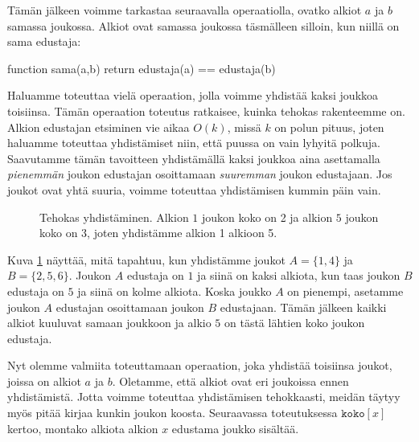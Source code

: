 Tämän jälkeen voimme tarkastaa seuraavalla operaatiolla,
ovatko alkiot $a$ ja $b$ samassa joukossa.
Alkiot ovat samassa joukossa täsmälleen silloin, kun niillä
on sama edustaja:

\begin{code}
function sama(a,b)
    return edustaja(a) == edustaja(b)
\end{code}

Haluamme toteuttaa vielä operaation, jolla voimme
yhdistää kaksi joukkoa toisiinsa.
Tämän operaation toteutus ratkaisee, kuinka tehokas rakenteemme on.
Alkion edustajan etsiminen vie aikaa $O(k)$,
missä $k$ on polun pituus,
joten haluamme toteuttaa yhdistämiset niin,
että puussa on vain lyhyitä polkuja.
Saavutamme tämän tavoitteen yhdistämällä kaksi joukkoa
aina asettamalla \emph{pienemmän} joukon
edustajan osoittamaan \emph{suuremman} joukon edustajaan.
Jos joukot ovat yhtä suuria, voimme toteuttaa yhdistämisen kummin päin vain.

\begin{figure}
\center
\begin{center}
\end{center}
\caption{Tehokas yhdistäminen. Alkion $1$ joukon koko on 2
ja alkion $5$ joukon koko on 3,
joten yhdistämme alkion 1 alkioon 5.}
\label{fig:tehyhd}
\end{figure}

Kuva \ref{fig:tehyhd} näyttää, mitä tapahtuu, kun yhdistämme joukot
$A=\{1,4\}$ ja $B=\{2,5,6\}$.
Joukon $A$ edustaja on $1$ ja siinä on kaksi alkiota,
kun taas joukon $B$ edustaja on $5$ ja siinä on kolme alkiota.
Koska joukko $A$ on pienempi, asetamme joukon $A$
edustajan osoittamaan joukon $B$ edustajaan.
Tämän jälkeen kaikki alkiot kuuluvat samaan joukkoon ja
alkio $5$ on tästä lähtien koko joukon edustaja.

Nyt olemme valmiita toteuttamaan operaation,
joka yhdistää toisiinsa joukot, joissa on alkiot $a$ ja $b$.
Oletamme, että alkiot ovat eri joukoissa ennen yhdistämistä.
Jotta voimme toteuttaa yhdistämisen tehokkaasti,
meidän täytyy myös pitää kirjaa kunkin joukon koosta.
Seuraavassa toteutuksessa $\texttt{koko}[x]$ kertoo,
montako alkiota alkion $x$ edustama joukko sisältää.


